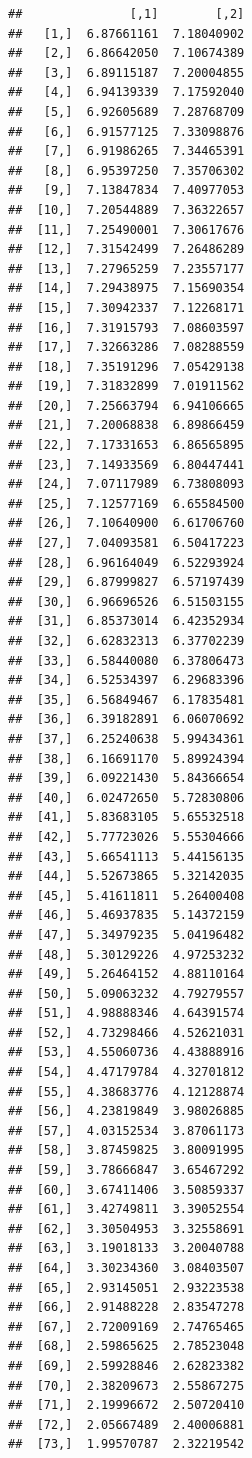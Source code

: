 \documentclass[12pt, twoside]{book}\usepackage[]{graphicx}\usepackage[]{color}
\makeatletter
\newenvironment{kframe}{%
 \def\at@end@of@kframe{}%
 \ifinner\ifhmode%
  \def\at@end@of@kframe{\end{minipage}}%
  \begin{minipage}{\columnwidth}%
 \fi\fi%
 \def\FrameCommand##1{\hskip\@totalleftmargin \hskip-\fboxsep
 \colorbox{shadecolor}{##1}\hskip-\fboxsep
     \hskip-\linewidth \hskip-\@totalleftmargin \hskip\columnwidth}%
 \MakeFramed {\advance\hsize-\width
   \@totalleftmargin\z@ \linewidth\hsize
   \@setminipage}}%
 {\par\unskip\endMakeFramed%
 \at@end@of@kframe}
\newenvironment{knitrout}{}{} %
\numberwithin{equation}{section}
\numberwithin{theorem}{section}
\numberwithin{teorema}{section}
\numberwithin{defi}{section}
\numberwithin{prop}{section}
\numberwithin{defi}{section}
\theoremstyle{plain}
\makeatother
\begin{document}
\begin{knitrout}
\begin{kframe}\begin{verbatim}
##               [,1]        [,2]
##   [1,]  6.87661161  7.18040902
##   [2,]  6.86642050  7.10674389
##   [3,]  6.89115187  7.20004855
##   [4,]  6.94139339  7.17592040
##   [5,]  6.92605689  7.28768709
##   [6,]  6.91577125  7.33098876
##   [7,]  6.91986265  7.34465391
##   [8,]  6.95397250  7.35706302
##   [9,]  7.13847834  7.40977053
##  [10,]  7.20544889  7.36322657
##  [11,]  7.25490001  7.30617676
##  [12,]  7.31542499  7.26486289
##  [13,]  7.27965259  7.23557177
##  [14,]  7.29438975  7.15690354
##  [15,]  7.30942337  7.12268171
##  [16,]  7.31915793  7.08603597
##  [17,]  7.32663286  7.08288559
##  [18,]  7.35191296  7.05429138
##  [19,]  7.31832899  7.01911562
##  [20,]  7.25663794  6.94106665
##  [21,]  7.20068838  6.89866459
##  [22,]  7.17331653  6.86565895
##  [23,]  7.14933569  6.80447441
##  [24,]  7.07117989  6.73808093
##  [25,]  7.12577169  6.65584500
##  [26,]  7.10640900  6.61706760
##  [27,]  7.04093581  6.50417223
##  [28,]  6.96164049  6.52293924
##  [29,]  6.87999827  6.57197439
##  [30,]  6.96696526  6.51503155
##  [31,]  6.85373014  6.42352934
##  [32,]  6.62832313  6.37702239
##  [33,]  6.58440080  6.37806473
##  [34,]  6.52534397  6.29683396
##  [35,]  6.56849467  6.17835481
##  [36,]  6.39182891  6.06070692
##  [37,]  6.25240638  5.99434361
##  [38,]  6.16691170  5.89924394
##  [39,]  6.09221430  5.84366654
##  [40,]  6.02472650  5.72830806
##  [41,]  5.83683105  5.65532518
##  [42,]  5.77723026  5.55304666
##  [43,]  5.66541113  5.44156135
##  [44,]  5.52673865  5.32142035
##  [45,]  5.41611811  5.26400408
##  [46,]  5.46937835  5.14372159
##  [47,]  5.34979235  5.04196482
##  [48,]  5.30129226  4.97253232
##  [49,]  5.26464152  4.88110164
##  [50,]  5.09063232  4.79279557
##  [51,]  4.98888346  4.64391574
##  [52,]  4.73298466  4.52621031
##  [53,]  4.55060736  4.43888916
##  [54,]  4.47179784  4.32701812
##  [55,]  4.38683776  4.12128874
##  [56,]  4.23819849  3.98026885
##  [57,]  4.03152534  3.87061173
##  [58,]  3.87459825  3.80091995
##  [59,]  3.78666847  3.65467292
##  [60,]  3.67411406  3.50859337
##  [61,]  3.42749811  3.39052554
##  [62,]  3.30504953  3.32558691
##  [63,]  3.19018133  3.20040788
##  [64,]  3.30234360  3.08403507
##  [65,]  2.93145051  2.93223538
##  [66,]  2.91488228  2.83547278
##  [67,]  2.72009169  2.74765465
##  [68,]  2.59865625  2.78523048
##  [69,]  2.59928846  2.62823382
##  [70,]  2.38209673  2.55867275
##  [71,]  2.19996672  2.50720410
##  [72,]  2.05667489  2.40006881
##  [73,]  1.99570787  2.32219542

\end{verbatim}
\end{kframe}
\end{knitrout}
\end{document}
